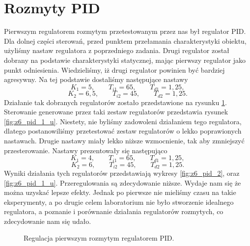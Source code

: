 \section{Rozmyty PID}
Pierwszym regulatorem rozmytym przetestowanym przez nas był regulator PID.
Dla dolnej części sterowań, przed punktem przełamania charakterystyki obiektu,
użyliśmy nastaw regulatora z poprzedniego zadania. Drugi regulator został dobrany
na podstawie charakterystyki statycznej, mając pierwszy regulator jako punkt odniesienia.
Wiedzieliśmy, iż drugi regulator powinien być bardziej agresywny.
Na tej podstawie dostaliśmy następujące nastawy
\begin{equation}
  K_1 = 5, \qquad T_{i1} = 65, \qquad T_{d1} = 1,25,
\end{equation}
\begin{equation}
  K_2 = 6,5, \qquad T_{i2} = 45, \qquad T_{d2} = 1,25.
\end{equation}
Działanie tak dobranych regulatorów zostało przedstawione na rysunku \ref{fig:z6_pid_1}.
Sterowanie generowane przez taki zestaw regulatorów przedstawia rysunek \ref{fig:z6_pid_1_u}.
Niestety, nie byliśmy zadowoleni działaniem tego regulatora, dlatego postanowiliśmy
przetestować zestaw regulatorów o lekko poprawionych nastawach.
Drugie nastawy miały lekko niższe wzmocnienie, tak aby zmniejszyć przesterowanie.
Nastawy prezentowały się następująco
\begin{equation}
  K_1 = 4, \qquad T_{i1} = 65, \qquad T_{d1} = 1,25,
\end{equation}
\begin{equation}
  K_2 = 6, \qquad T_{i2} = 45, \qquad T_{d2} = 1,25.
\end{equation}
Wyniki działania tych regulatorów przedstawiają wykresy \ref{fig:z6_pid_2}, oraz
\ref{fig:z6_pid_1_u}. Przeregulowania są zdecydowanie niższe. Wydaje nam się
że można uzyskać lepsze efekty. Jednak po pierwsze nie mieliśmy czasu na takie eksperymenty,
a po drugie celem laboratorium nie było stworzenie idealnego regulatora, a
poznanie i porównanie działania regulatorów rozmytych, co zdecydowanie nam się udało.

\begin{figure}[tb]
\centering
{}
\caption{Regulacja pierwszym rozmytym regulatorem PID.}
\label{fig:z6_pid_1}
\end{figure}

